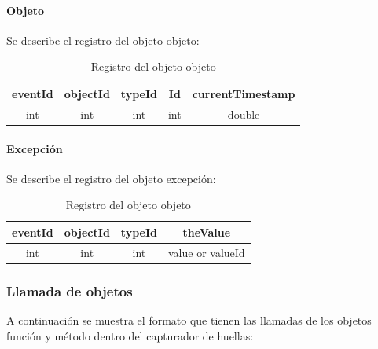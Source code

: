 \documentclass[12pt,legalpaper]{report}
\begin{document}
				\paragraph{Objeto}

Se describe el registro del objeto objeto: \\

\begin{table}[!h]
\begin{center}
\begin{tabular}{| c | c | c | c | c |}
\hline
\rowcolor[gray]{0.9}eventId & objectId & typeId & Id & currentTimestamp\\
\hline
int & int & int & int & double\\
\hline
\end{tabular}
\caption{Registro del objeto objeto} 
\end{center}
\end{table}


				\paragraph{Excepción}

Se describe el registro del objeto excepción: \\

\begin{table}[!h]
\begin{center}
\begin{tabular}{| c | c | c | c |}
\hline
\rowcolor[gray]{0.9}eventId & objectId & typeId & theValue\\
\hline
int & int & int & value or valueId\footnotemark[1]\\
\hline
\end{tabular}
\caption{Registro del objeto objeto} 
\end{center}
\end{table}



			\subsubsection{Llamada de objetos}

A continuación se muestra el formato que tienen las llamadas de los objetos función y método dentro del capturador de huellas:\\
\end{document}
